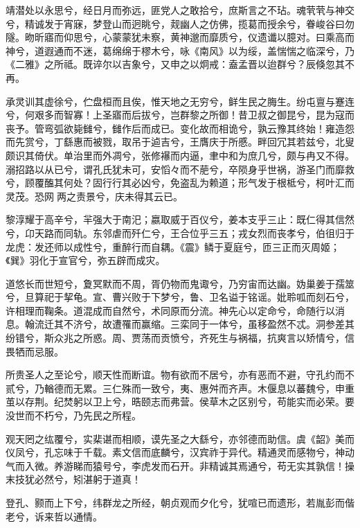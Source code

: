 \documentclass[12pt,UTF8]{ctexbook}
\begin{document}
靖潜处以永思兮，经日月而弥远，匪党人之敢拾兮，庶斯言之不玷。魂茕茕与神交兮，精诚发于宵寐，梦登山而迥眺兮，觌幽人之仿佛，揽葛而授余兮，眷峻谷曰勿隧。昒昕寤而仰思兮，心蒙蒙犹未察，黄神邈而靡质兮，仪遗谶以臆对。曰乘高而神兮，道遐通而不迷，葛绵绵于樛木兮，咏《南风》以为绥，盖惴惴之临深兮，乃《二雅》之所祗。既谇尔以吉象兮，又申之以炯戒：盍孟晋以迨群兮？辰倏忽其不再。



承灵训其虚徐兮，伫盘桓而且俟，惟天地之无穷兮，鲜生民之脢生。纷屯亶与蹇连兮，何艰多而智寡！上圣寤而后拔兮，岂群黎之所御！昔卫叔之御昆兮，昆为寇而丧予。管弯弧欲毙雠兮，雠作后而成已。变化故而相诡兮，孰云豫其终始！雍造怨而先赏兮，丁繇惠而被戮，取吊于逌吉兮，王膺庆于所慼。畔回冗其若兹兮，北叟颇识其倚伏。单治里而外凋兮，张修襮而内逼，聿中和为庶几兮，颇与冉又不得。溺招路以从已兮，谓孔氏犹未可，安慆々而不萉兮，卒陨身乎世祸，游圣门而靡救兮，顾覆醢其何处？固行行其必凶兮，免盗乱为赖道；形气发于根柢兮，柯叶汇而灵茂。恐网两之责景兮，庆未得其云已。



黎淳耀于高辛兮，羋强大于南汜；嬴取威于百仪兮，姜本支乎三止：既仁得其信然兮，卬天路而同轨。东邻虐而歼仁兮，王合位乎三五；戎女烈而丧孝兮，伯徂归于龙虎：发还师以成性兮，重醉行而自耦。《震》鳞于夏庭兮，匝三正而灭周姬；《巽》羽化于宣官兮，弥五辟而成灾。



道悠长而世短兮，夐冥默而不周，胥仍物而鬼诹兮，乃穷宙而达幽。妫巢姜于孺筮兮，旦算祀于挈龟。宣、曹兴败于下梦兮，鲁、卫名谥于铭谣。妣聆呱而刻石兮，许相理而鞠条。道混成而自然兮，术同原而分流。神先心以定命兮，命随行以消息。翰流迁其不济兮，故遭罹而赢缩。三栾同于一体兮，虽移盈然不忒。洞参差其纷错兮，斯众兆之所惑。周、贾荡而贡愤兮，齐死生与祸福，抗爽言以矫情兮，信畏牺而忌服。



所贵圣人之至论兮，顺天性而断谊。物有欲而不居兮，亦有恶而不避，守孔约而不贰兮，乃輶德而无累。三仁殊而一致兮，夷、惠舛而齐声。木偃息以蕃魏兮，申重茧以存荆。纪焚躬以卫上兮，晧颐志而弗营。侯草木之区别兮，苟能实而必荣。要没世而不朽兮，乃先民之所程。



观天罔之纮覆兮，实棐谌而相顺，谟先圣之大繇兮，亦邻德而助信。虞《韶》美而仪凤兮，孔忘味于千载。素文信而底麟兮，汉宾祚于异代。精通灵而感物兮，神动气而入微。养游睇而猿号兮，李虎发而石开。非精诚其焉通兮，苟无实其孰信！操末技犹必然兮，矧湛躬于道真！



登孔、颢而上下兮，纬群龙之所经，朝贞观而夕化兮，犹喧已而遗形，若胤彭而偕老兮，诉来哲以通情。
\end{document}
